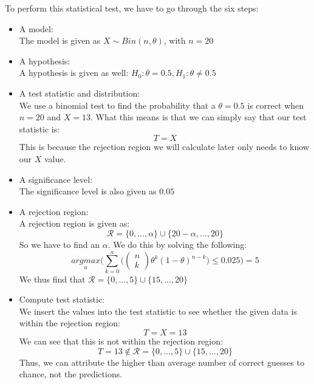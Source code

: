 To perform this statistical test, we have to go through the six steps:
\begin{itemize}
\item A model: \\
The model is given as $X \sim Bin(n,\theta)$, with $n = 20$
\item A hypothesis: \\
A hypothesis is given as well: $H_0: \theta = 0.5, H_1: \theta \neq 0.5$
\item A test statistic and distribution: \\
We use a binomial test to find the probability that a $\theta = 0.5$ is correct when $n = 20$ and $X = 13$. What this means is that we can simply say that our test statistic is:
$$
T = X
$$
This is because the rejection region we will calculate later only needs to know our $X$ value.
\item A significance level: \\
The significance level is also given as $0.05$
\item A rejection region: \\
A rejection region is given as:
$$
\mathcal{R}=\{0,...,\alpha\}\cup\{20-\alpha,...,20\}
$$
So we have to find an $\alpha$. We do this by solving the following:
$$
\underset{a}{argmax} \Bigg(\sum_{k=0}^a\Bigg(\begin{pmatrix} n \\ k \end{pmatrix} \theta^k (1-\theta)^{n-k}\Bigg) \leq 0.025 \Bigg) = 5
$$
We thus find that $\mathcal{R}=\{0,...,5\}\cup\{15,...,20\}$
\item Compute test statistic: \\
We insert the values into the test statistic to see whether the given data is within the rejection region:
$$
T = X = 13
$$
We can see that this is not within the rejection region:
$$
T = 13 \not\in \mathcal{R} = \{0,...,5\} \cup \{15,...,20\}
$$
Thus, we can attribute the higher than average number of correct guesses to chance, not the predictions.
\end{itemize}